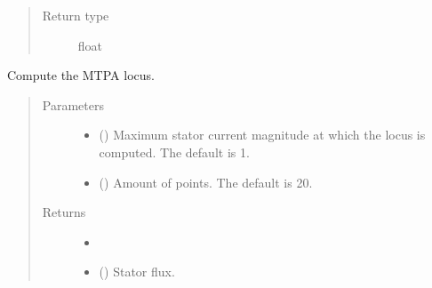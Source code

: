 \documentclass[letterpaper,10pt,english]{sphinxmanual}
\begin{document}
\begin{fulllineitems}
\begin{fulllineitems}
\begin{quote}
\begin{description}
\item[{Return type}] \leavevmode
\sphinxAtStartPar
float

\end{description}\end{quote}

\end{fulllineitems}


\begin{fulllineitems}
\label{\detokenize{control.sm:control.sm.torque.TorqueCharacteristics.mtpa_locus}}
\pysigstartsignatures
{}
\pysigstopsignatures
\sphinxAtStartPar
Compute the MTPA locus.
\begin{quote}\begin{description}
\item[{Parameters}] \leavevmode\begin{itemize}
\item {} 
\sphinxAtStartPar
{} (\sphinxstyleliteralemphasis{\sphinxupquote{, }}) \textendash{} Maximum stator current magnitude at which the locus is computed.
The default is 1.

\item {} 
\sphinxAtStartPar
{} (\sphinxstyleliteralemphasis{\sphinxupquote{, }}) \textendash{} Amount of points. The default is 20.

\end{itemize}

\item[{Returns}] \leavevmode
\sphinxAtStartPar
\begin{itemize}
\item {} 
\sphinxAtStartPar
{}

\item {} 
\sphinxAtStartPar
{} () \textendash{} Stator flux.


\end{itemize}
\end{description}
\end{quote}
\end{fulllineitems}
\end{fulllineitems}
\end{document}
